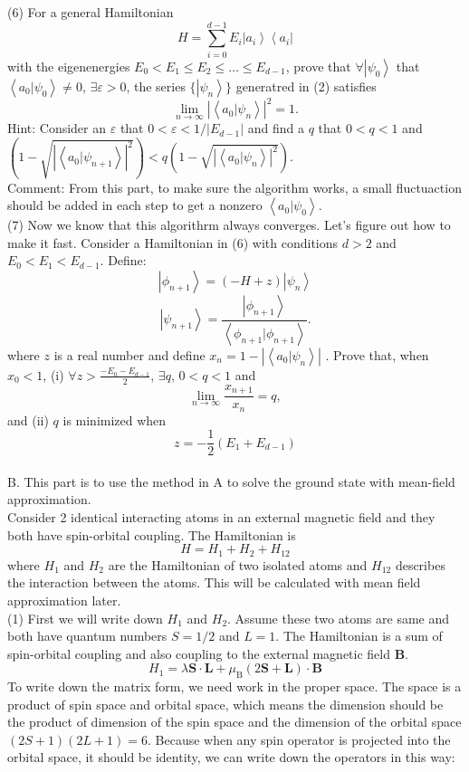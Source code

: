 \documentclass[letter]{article}
\begin{document}
\indent (6) For a general Hamiltonian
$$ H = \sum_{i=0}^{d-1} E_{i} \left|a_i\right>\left<a_i\right|
$$
with the eigenenergies $E_0<E_1\leq E_2 \leq \ldots\leq E_{d-1}$, prove that $\forall \left|\psi_0\right> $ that $\left<a_0|\psi_0\right>\neq 0$, $\exists \varepsilon>0$, the series $\{\left| \psi_n\right>\}$ generatred in (2) satisfies $$
\lim_{n\rightarrow\infty} \left|\left<a_0|\psi_n\right>\right|^2=1.
$$
\indent Hint: Consider an $\varepsilon$ that $0<\varepsilon<1/|E_{d-1}|$ and find a $q$ that $0<q<1$ and $\left(1-\sqrt{\left|\left<a_0|\psi_{n+1}\right>\right|^2}\right)<q\left(1-\sqrt{\left|\left<a_0|\psi_{n}\right>\right|^2}\right)$.\\
\indent Comment: From this part, to make sure the algorithm works, a small fluctuaction should be added in each step to get a nonzero $\left<a_0|\psi_0\right>$.\\
\indent (7) Now we know that this algorithrm always converges. Let's figure out how to make it fast. Consider a Hamiltonian in (6) with conditions $d>2$ and $E_0<E_1<E_{d-1}$. Define:$$\left|\phi_{n+1}\right>=\left(-H+z\right) \left|\psi_n\right>$$
$$\left|\psi_{n+1}\right>=\frac{\left|\phi_{n+1}\right>}{\left<\phi_{n+1}|\phi_{n+1}\right>}.$$
where $z$ is a real number and define $x_n=1-\left|\left<a_0|\psi_n\right>\right|$
. Prove that, when $x_0<1$, (i) $\forall z >\frac{-E_0-E_{d-1}}{2}$, $\exists q$, $0< q <1$ and $$
\lim _{n\rightarrow \infty} \frac{x_{n+1}}{x_n}=q,
$$
and (ii) $q$ is minimized when $$z=-\frac{1}{2}\left(E_1+E_{d-1}\right)$$\\
{\large{B}}. This part is to use the method in A to solve the ground state with mean-field approximation. \\
\indent Consider 2 identical interacting atoms in an external magnetic field and they both have spin-orbital coupling. The Hamiltonian is 
$$
H=H_1+H_2+H_{12}
$$
where $H_1$ and $H_2$ are the Hamiltonian of two isolated atoms and $H_{12}$ describes the interaction between the atoms. This will be calculated with mean field approximation later. \\
\indent (1) First we will write down $H_{1}$ and $H_2$. Assume these two atoms are same and both have quantum numbers $S=1/2$ and $L=1$. The Hamiltonian is a sum of spin-orbital coupling and also coupling to the external magnetic field $\bm{B}$.
$$H_1=\lambda \bm{S}\cdot\bm{L}+\mu_{\mathrm{B}}(2\bm{S}+\bm{L})\cdot\bm{B}
$$
To write down the matrix form, we need work in the proper space. The space is a product of spin space and orbital space, which means the dimension should be the product of dimension of the spin space and the dimension of the orbital space $(2S+1)(2L+1)=6$. Because when any spin operator is projected into the orbital space, it should be identity, we can write down the operators in this way:
\end{document}

